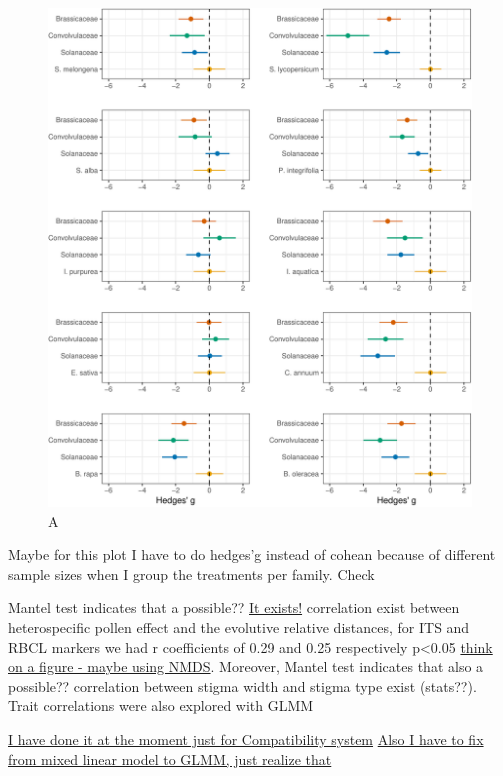 \documentclass[11pt,a4paper]{article}
\begin{document}
\newpage

\begin{figure}
\centering
\includegraphics{output/figures/unnamed-chunk-6-1.pdf}
\caption{A}
\end{figure}

Maybe for this plot I have to do hedges'g instead of cohean because of
different sample sizes when I group the treatments per family. Check

\newpage

Mantel test indicates that a possible?? \href{}{It exists!} correlation
exist between heterospecific pollen effect and the evolutive relative
distances, for ITS and RBCL markers we had r coefficients of 0.29 and
0.25 respectively p\textless{}0.05 \href{}{think on a figure - maybe
using NMDS}. Moreover, Mantel test indicates that also a possible??
correlation between stigma width and stigma type exist (stats??). Trait
correlations were also explored with GLMM

\href{Jose}{I have done it at the moment just for Compatibility system}
\href{Jose}{Also I have to fix from mixed linear model to GLMM, just
realize that}
\end{document}
